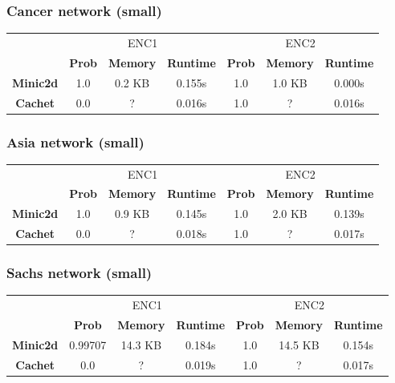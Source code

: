 \subsubsection{Cancer network (small)}
\begin{table}[H]
    \centering
    \begin{tabular}{c|c|c|c|c|c|c|}
    \cline{2-7}
            & \multicolumn{3}{c|}{ENC1} & \multicolumn{3}{c|}{ENC2} \\ \cline{2-7}
      & \textbf{Prob}  & \textbf{Memory}  & \textbf{Runtime} & \textbf{Prob}  & \textbf{Memory}  & \textbf{Runtime} \\ \cline{1-7}
      \textbf{Minic2d} & 1.0  & 0.2 KB    & 0.155s   & 1.0    & 1.0 KB    & 0.000s \\
      \hline
    \textbf{Cachet}  & 0.0  & ?    & 0.016s       & 1.0     & ?    & 0.016s    \\ \cline{1-7}
    \end{tabular}
\end{table}

\subsubsection{Asia network (small)}
\begin{table}[H]
    \centering
    \begin{tabular}{c|c|c|c|c|c|c|}
    \cline{2-7}
            & \multicolumn{3}{c|}{ENC1} & \multicolumn{3}{c|}{ENC2} \\ \cline{2-7}
      & \textbf{Prob}  & \textbf{Memory}  & \textbf{Runtime} & \textbf{Prob}  & \textbf{Memory}  & \textbf{Runtime} \\ \cline{1-7}
      \textbf{Minic2d} & 1.0  & 0.9 KB    & 0.145s   & 1.0    & 2.0 KB    & 	 0.139s \\
      \hline
    \textbf{Cachet}  & 0.0  & ?    & 0.018s       & 1.0     & ?    & 0.017s    \\ \cline{1-7}
    \end{tabular}
\end{table}

\subsubsection{Sachs network (small)}
\begin{table}[H]
    \centering
    \begin{tabular}{c|c|c|c|c|c|c|}
    \cline{2-7}
            & \multicolumn{3}{c|}{ENC1} & \multicolumn{3}{c|}{ENC2} \\ \cline{2-7}
      & \textbf{Prob}  & \textbf{Memory}  & \textbf{Runtime} & \textbf{Prob}  & \textbf{Memory}  & \textbf{Runtime} \\ \cline{1-7}
      \textbf{Minic2d} & 0.99707  & 14.3 KB    & 0.184s   & 1.0    & 14.5 KB   & 	0.154s \\
      \hline
    \textbf{Cachet}  & 0.0  & ?    & 0.019s       & 1.0     & ?    & 0.017s    \\ \cline{1-7}
    \end{tabular}
\end{table}

